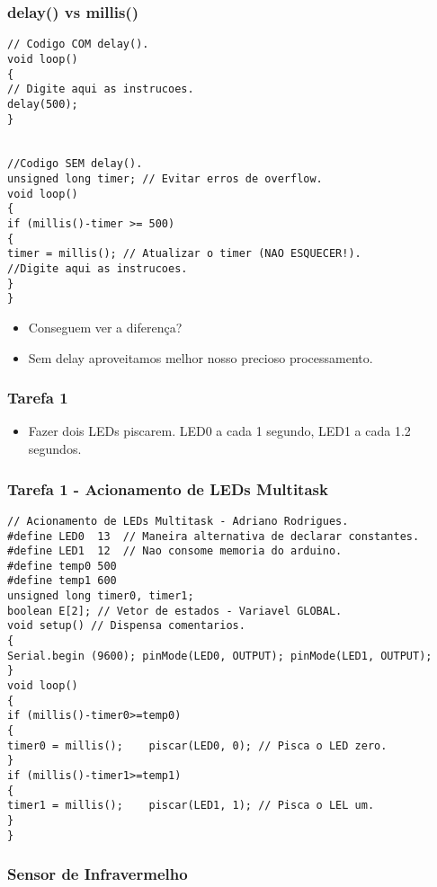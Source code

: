 \documentclass{beamer}
\begin{document}
\begin{frame}[fragile]
	\frametitle{\textbf{delay()} vs \textbf{millis()}}
\begin{lstlisting}[style=Arduino,basicstyle=\scriptsize \ttfamily]
// Codigo COM delay().
void loop()
{
// Digite aqui as instrucoes.
delay(500);
}


//Codigo SEM delay().
unsigned long timer; // Evitar erros de overflow.
void loop()
{
if (millis()-timer >= 500)
{
timer = millis(); // Atualizar o timer (NAO ESQUECER!).
//Digite aqui as instrucoes.
}
}
\end{lstlisting}
	\begin{itemize}
	\item<1-> Conseguem ver a diferença?
	\item<2-> Sem delay aproveitamos melhor nosso precioso processamento.
	\end{itemize}
\end{frame}

\begin{frame}
	\frametitle{Tarefa 1}
	\begin{itemize}
	\item Fazer dois LEDs piscarem. LED0 a cada 1 segundo, LED1 a cada 1.2 segundos.
	\end{itemize}
\end{frame}

\begin{frame}[fragile]
	\frametitle{Tarefa 1 - Acionamento de LEDs Multitask}
	\begin{lstlisting}[style=Arduino,basicstyle=\scriptsize \ttfamily]
// Acionamento de LEDs Multitask - Adriano Rodrigues.
#define LED0  13  // Maneira alternativa de declarar constantes.
#define LED1  12  // Nao consome memoria do arduino.
#define temp0 500
#define temp1 600
unsigned long timer0, timer1;
boolean E[2]; // Vetor de estados - Variavel GLOBAL.
void setup() // Dispensa comentarios.
{
Serial.begin (9600); pinMode(LED0, OUTPUT); pinMode(LED1, OUTPUT);
}
void loop()
{
if (millis()-timer0>=temp0)
{
timer0 = millis();    piscar(LED0, 0); // Pisca o LED zero.
}
if (millis()-timer1>=temp1)
{
timer1 = millis();    piscar(LED1, 1); // Pisca o LEL um.
}
}
\end{lstlisting}
\end{frame}

\begin{frame}
	\frametitle{Sensor de Infravermelho}
	\begin{center}
	\end{center}
\end{frame}
\end{document}
